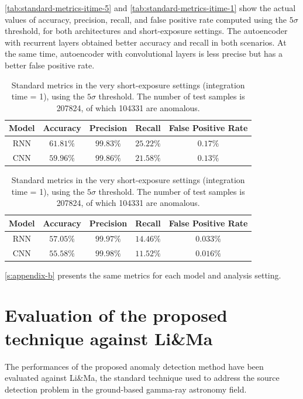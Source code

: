 \autoref{tab:standard-metrics-itime-5} and \autoref{tab:standard-metrics-itime-1} show the actual values of accuracy, precision, recall, and false positive rate computed using the $5\sigma$ threshold, for both architectures and short-exposure settings. The autoencoder with recurrent layers obtained better accuracy and recall in both scenarios. At the same time, autoencoder with convolutional layers is less precise but has a better false positive rate. 
\begin{table}[!htb]
\centering
\begin{tabular}{|c|c|c|c|c|}
    \hline
    Model & Accuracy & Precision & Recall & False Positive Rate \\ 
    \hline
    RNN & $61.81\%$ & $99.83\%$ & $25.22\%$ & $0.17\%$ \\
    CNN & $59.96\%$ & $99.86\%$ & $21.58\%$ & $0.13\%$ \\
    \hline
    \end{tabular}
\caption{Standard metrics in the short-exposure settings (integration time = 5), using the $5\sigma$ threshold. The number of test samples is 40224, of which 20531 are anomalous.}
\label{tab:standard-metrics-itime-5}
\vspace{1cm}
\centering
\begin{tabular}{|c|c|c|c|c|}
    \hline
    Model & Accuracy & Precision & Recall & False Positive Rate \\ 
    \hline
    RNN & $57.05\%$ & $99.97\%$ & $14.46\%$ & $0.033\%$ \\
    CNN & $55.58\%$ & $99.98\%$ & $11.52\%$ & $0.016\%$ \\
    \hline
\end{tabular}
\caption{Standard metrics in the very short-exposure settings (integration time = 1), using the $5\sigma$ threshold. The number of test samples is 207824, of which 104331 are anomalous.}
\label{tab:standard-metrics-itime-1}
\end{table}
\autoref{s:appendix-b} presents the same metrics for each model and analysis setting. 


\FloatBarrier
\section{Evaluation of the proposed technique against Li\&Ma}
\label{s:ad-vs-lima}
The performances of the proposed anomaly detection method have been evaluated against Li\&Ma, the standard technique used to address the source detection problem in the ground-based gamma-ray astronomy field.
\FloatBarrier
